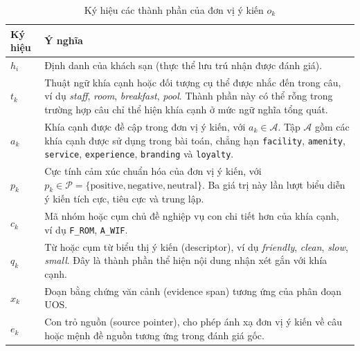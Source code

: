 \begin{table}[htbp]
  \centering
  \caption{Ký hiệu các thành phần của đơn vị ý kiến $o_k$}
  \label{tab:ky-hieu-don-vi-y-kien}
  \small
  \begin{tabularx}{\textwidth}{@{}L{0.16\textwidth} Y@{}}
    \toprule
    \textbf{Ký hiệu} & \textbf{Ý nghĩa} \\
    \midrule
    $h_i$ &
    Định danh của khách sạn (thực thể lưu trú nhận được đánh giá). \\

    $t_k$ &
    Thuật ngữ khía cạnh hoặc đối tượng cụ thể được nhắc đến trong câu,
    ví dụ \textit{staff}, \textit{room}, \textit{breakfast}, \textit{pool}.
    Thành phần này có thể rỗng trong trường hợp câu chỉ thể hiện khía cạnh
    ở mức ngữ nghĩa tổng quát. \\

    $a_k$ &
    Khía cạnh được đề cập trong đơn vị ý kiến, với $a_k \in \mathcal{A}$.
    Tập $\mathcal{A}$ gồm các khía cạnh được sử dụng trong bài toán, chẳng hạn
    \texttt{facility}, \texttt{amenity}, \texttt{service},
    \texttt{experience}, \texttt{branding} và \texttt{loyalty}. \\

    $p_k$ &
    Cực tính cảm xúc chuẩn hóa của đơn vị ý kiến, với
    $p_k \in \mathcal{P} = \{\mathrm{positive}, \mathrm{negative}, \mathrm{neutral}\}$.
    Ba giá trị này lần lượt biểu diễn ý kiến tích cực, tiêu cực và trung lập. \\

    $c_k$ &
    Mã nhóm hoặc cụm chủ đề nghiệp vụ con chi tiết hơn của khía cạnh,
    ví dụ \texttt{F\_ROM}, \texttt{A\_WIF}. \\

    $q_k$ &
    Từ hoặc cụm từ biểu thị ý kiến (descriptor), ví dụ \textit{friendly},
    \textit{clean}, \textit{slow}, \textit{small}. Đây là thành phần thể hiện
    nội dung nhận xét gắn với khía cạnh. \\

    $x_k$ &
    Đoạn bằng chứng văn cảnh (evidence span) tương ứng của phân đoạn UOS. \\

    $e_k$ &
    Con trỏ nguồn (source pointer), cho phép ánh xạ đơn vị ý kiến về câu hoặc mệnh đề
    nguồn tương ứng trong đánh giá gốc. \\
    \bottomrule
  \end{tabularx}
\end{table}

